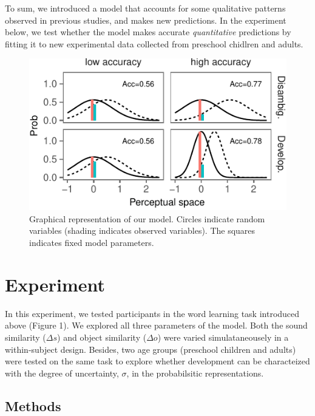 \documentclass[10pt, letterpaper]{article}
\newenvironment{CodeChunk}{}{}
\begin{document}
To sum, we introduced a model that accounts for some qualitative
patterns observed in previous studies, and makes new predictions. In the
experiment below, we test whether the model makes accurate
\emph{quantitative} predictions by fitting it to new experimental data
collected from preschool chidlren and adults.

\begin{CodeChunk}
\begin{figure}[H]

{\centering \includegraphics{figs/illus-1} 

}

\caption{\label{fig:illus}Graphical representation of our model. Circles indicate random variables (shading indicates observed variables). The squares indicates fixed model parameters.}\label{fig:illus}
\end{figure}
\end{CodeChunk}

\section{Experiment}\label{experiment}

In this experiment, we tested participants in the word learning task
introduced above (Figure 1). We explored all three parameters of the
model. Both the sound similarity (\(\Delta s\)) and object similarity
(\(\Delta o\)) were varied simulataneousely in a within-subject design.
Besides, two age groups (preschool children and adults) were tested on
the same task to explore whether development can be characteized with
the degree of uncertainty, \(\sigma\), in the probabilsitic
representations.

\subsection{Methods}\label{methods}
\end{document}
